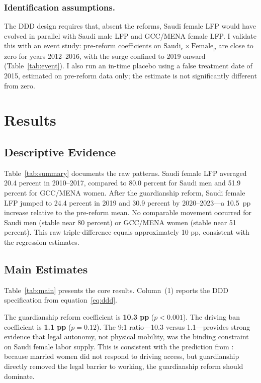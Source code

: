 \documentclass[12pt]{article}
\begin{document}
\subsubsection*{Identification assumptions.} The DDD design requires that, absent the reforms, Saudi female LFP would have evolved in parallel with Saudi male LFP and GCC/MENA female LFP. I validate this with an event study: pre-reform coefficients on $\text{Saudi}_c \times \text{Female}_g$ are close to zero for years 2012--2016, with the surge confined to 2019 onward (Table~\ref{tab:event}). I also run an in-time placebo using a false treatment date of 2015, estimated on pre-reform data only; the estimate is not significantly different from zero.

\section{Results}



\subsection{Descriptive Evidence}

Table~\ref{tab:summary} documents the raw patterns. Saudi female LFP averaged 20.4 percent in 2010--2017, compared to 80.0 percent for Saudi men and 51.9 percent for GCC/MENA women. After the guardianship reform, Saudi female LFP jumped to 24.4 percent in 2019 and 30.9 percent by 2020--2023---a 10.5~pp increase relative to the pre-reform mean. No comparable movement occurred for Saudi men (stable near 80 percent) or GCC/MENA women (stable near 51 percent). This raw triple-difference equals approximately 10 pp, consistent with the regression estimates.



\subsection{Main Estimates}

Table~\ref{tab:main} presents the core results. Column~(1) reports the DDD specification from equation~\eqref{eq:ddd}.

The guardianship reform coefficient is \textbf{10.3 pp} ($p < 0.001$). The driving ban coefficient is \textbf{1.1 pp} ($p = 0.12$). The 9:1 ratio---10.3 versus 1.1---provides strong evidence that legal autonomy, not physical mobility, was the binding constraint on Saudi female labor supply. This is consistent with the prediction from \citet{BursztynGY2023}: because married women did not respond to driving access, but guardianship directly removed the legal barrier to working, the guardianship reform should dominate.
\end{document}
